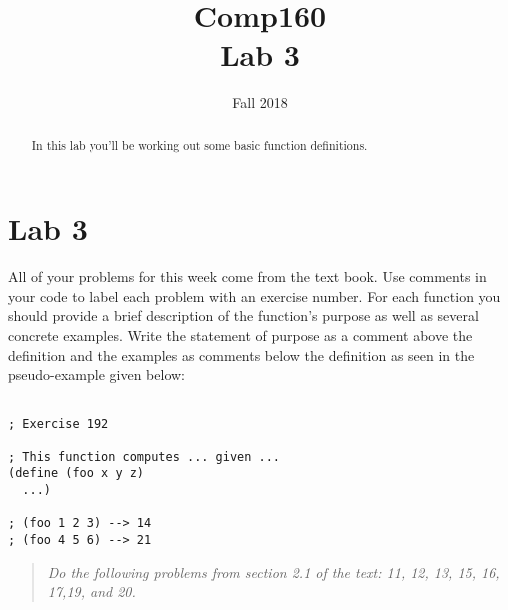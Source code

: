 \documentclass[nobib]{tufte-handout}
\title{Comp160 \\ Lab 3 }
\author{}
\date{ Fall 2018 }
\begin{document}
\maketitle

\begin{abstract}
In this lab you'll be working out some basic function definitions.
\end{abstract}

\section{Lab 3}

All of your problems for this week come from the text book. Use comments in your code to label each problem with an exercise number. For each function you should provide a brief description of the function's purpose as well as several concrete examples. Write the statement of purpose as a comment above the definition and the examples as comments below the definition as seen in the pseudo-example given below:

\begin{lstlisting}

; Exercise 192

; This function computes ... given ...
(define (foo x y z)
  ...)

; (foo 1 2 3) --> 14
; (foo 4 5 6) --> 21
\end{lstlisting}

\vspace{1in}

\begin{quote}
  \textit{
Do the following problems from section 2.1 of the text: 11, 12, 13, 15, 16, 17,19, and 20.
}
\end{quote}
\end{document}
